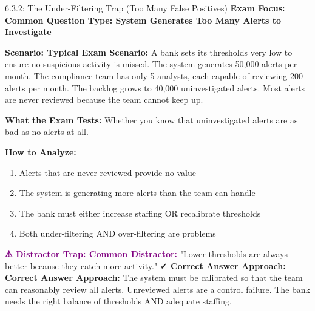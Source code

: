\documentclass[11pt,a4paper]{beamer}
\newcommand{\examfocus}[1]{\textcolor{orange!80!black}{\textbf{Exam Focus: #1}}}
\newcommand{\trap}[1]{\textcolor{purple}{\textbf{⚠️ Distractor Trap: #1}}}
\newcommand{\correct}[1]{\textcolor{green!50!black}{\textbf{✓ Correct Answer Approach: #1}}}
\newcommand{\scenario}[1]{\textcolor{blue!70!black}{\textbf{Scenario: #1}}}
\begin{document}
	\begin{frame}{6.3.2: The Under-Filtering Trap (Too Many False Positives)}
		\examfocus{Common Question Type: System Generates Too Many Alerts to Investigate}
		
		\scenario{Typical Exam Scenario:}
		A bank sets its thresholds very low to ensure no suspicious activity is missed. The system generates 50,000 alerts per month. The compliance team has only 5 analysts, each capable of reviewing 200 alerts per month. The backlog grows to 40,000 uninvestigated alerts. Most alerts are never reviewed because the team cannot keep up.
		
		\textbf{What the Exam Tests:} Whether you know that uninvestigated alerts are as bad as no alerts at all.
		
		\textbf{How to Analyze:}
		\begin{enumerate}
			\item Alerts that are never reviewed provide no value
			\item The system is generating more alerts than the team can handle
			\item The bank must either increase staffing OR recalibrate thresholds
			\item Both under-filtering AND over-filtering are problems
		\end{enumerate}
		
		\trap{Common Distractor:} "Lower thresholds are always better because they catch more activity."
		\correct{Correct Answer Approach:} The system must be calibrated so that the team can reasonably review all alerts. Unreviewed alerts are a control failure. The bank needs the right balance of thresholds AND adequate staffing.
	\end{frame}
	
\end{document}
